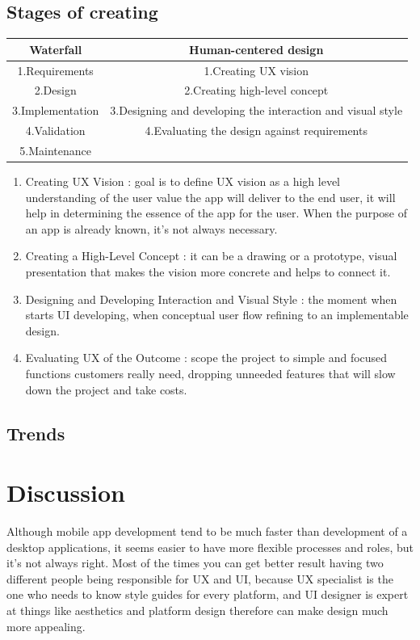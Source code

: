 \documentclass[10pt,twoside,english,a4paper]{article}
\begin{document}
\subsection{Stages of creating}	
\begin{center}
\begin{tabular}{ |c|c| } 
 \hline
 Waterfall & Human-centered design \\ 
\hline\hline
 1.Requirements & 1.Creating UX vision \\ 
\hline
 2.Design & 2.Creating high-level concept \\ 
 \hline
3.Implementation& 3.Designing and developing the interaction and visual style\\ 
 \hline 
4.Validation & 4.Evaluating the design against requirements\\ 
 \hline
5.Maintenance&  \\ 
 \hline
\end{tabular}
\end{center}
\cite{AllUX}
\begin{enumerate}
\item Creating UX Vision : goal is to define UX vision as a high level understanding of the user value the app will deliver to the end user, it will help in determining the essence of the app for the user. When the purpose of an app is already known, it’s not always necessary.
\item Creating a High-Level Concept : it can be a drawing or a prototype, visual presentation that makes the vision more concrete and helps to connect it. 
\item Designing and Developing Interaction and Visual Style : the moment when starts UI developing, when conceptual user flow refining to an implementable design.
\item Evaluating UX of the Outcome : scope the project to simple and focused functions customers really need, dropping unneeded features that will slow down the project and take costs.\cite{Kuusinen2014}
\end{enumerate}

\subsection{Trends}

\section{Discussion}
Although mobile app development tend to be much faster than development of a desktop applications, it seems easier to have more flexible processes and roles, but it’s not always right. Most of the times you can get better result having two different people being responsible for UX and UI, because UX specialist is the one who needs to know style guides for every platform, and UI designer is expert at things like aesthetics and platform design therefore can make design much more appealing.
\end{document}
